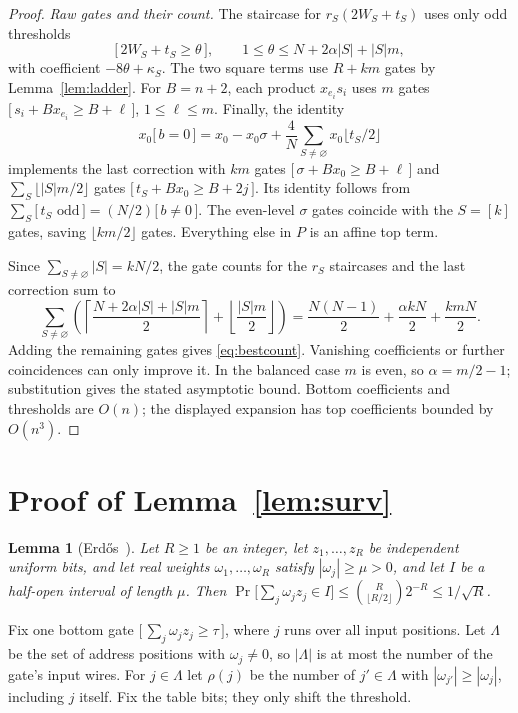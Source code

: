 \documentclass[11pt,letterpaper]{article}
\newtheorem{lemma}[theorem]{Lemma}
\theoremstyle{remark}
\newcommand{\ind}[1]{\bigl[\,#1\,\bigr]}
\newcommand{\sect}[1]{\section{\texorpdfstring{\color{ink}#1}{#1}}}
\begin{document}
\begin{proof}
\emph{Raw gates and their count.}
The staircase for $r_S(2W_S+t_S)$ uses only odd thresholds
\[
\ind{2W_S+t_S\ge\theta},\qquad
1\le\theta\le N+2\alpha|S|+|S|m,
\]
with coefficient $-8\theta+\kappa_S$. The two square terms use $R+km$
gates by Lemma~\ref{lem:ladder}. For $B=n+2$, each product $x_{e_i}s_i$
uses $m$ gates $\ind{s_i+Bx_{e_i}\ge B+\ell}$, $1\le\ell\le m$.
Finally, the identity
\[
x_0\ind{b=0}=x_0-x_0\sigma+
 \frac4N\sum_{S\ne\varnothing}x_0\lfloor t_S/2\rfloor
\]
implements the last correction with $km$ gates
$\ind{\sigma+Bx_0\ge B+\ell}$ and
$\sum_S\lfloor |S|m/2\rfloor$ gates
$\ind{t_S+Bx_0\ge B+2j}$. Its identity follows from
$\sum_S\ind{t_S\text{ odd}}=(N/2)\ind{b\ne0}$.
The even-level $\sigma$ gates coincide with the $S=[k]$ gates, saving
$\lfloor km/2\rfloor$ gates. Everything else in $P$ is an affine top term.

Since $\sum_{S\ne\varnothing}|S|=kN/2$, the gate counts for the $r_S$
staircases and the last correction sum to
\[
\sum_{S\ne\varnothing}\left(
 \left\lceil\frac{N+2\alpha|S|+|S|m}{2}\right\rceil
 +\left\lfloor\frac{|S|m}{2}\right\rfloor\right)
 =\frac{N(N-1)}2+\frac{\alpha kN}2+\frac{kmN}2.
\]
Adding the remaining gates gives \eqref{eq:bestcount}. Vanishing coefficients
or further coincidences can only improve it. In the balanced case $m$ is even,
so $\alpha=m/2-1$; substitution gives the stated asymptotic bound.
Bottom coefficients and thresholds are $O(n)$; the displayed
expansion has top coefficients bounded by $O(n^3)$.
\end{proof}

\renewcommand{\thesection}{\Alph{section}}
\sect{Proof of Lemma~\ref{lem:surv}}\label{app:surv}

\begin{lemma}[Erd\H{o}s~\cite{Erdos}]\label{fact:lo}
Let $R\ge1$ be an integer, let $z_1,\dots,z_R$ be independent uniform
bits, and let real weights $\omega_1,\dots,\omega_R$ satisfy $|\omega_j|\ge\mu>0$, and let $I$ be a half-open interval of length
$\mu$. Then
$\Pr\bigl[\sum_j\omega_jz_j\in I\bigr]\le\binom{R}{\lfloor R/2\rfloor}2^{-R}\le1/\sqrt R$.
\end{lemma}

Fix one bottom gate $\ind{\sum_j\omega_jz_j\ge\tau}$, where $j$ runs over
all input positions. Let $\Lambda$ be the set of address positions with
$\omega_j\ne0$, so $|\Lambda|$ is at most the number of the gate's input wires.
For $j\in \Lambda$ let $\rho(j)$ be the number of $j'\in \Lambda$ with
$|\omega_{j'}|\ge|\omega_j|$, including $j$ itself. Fix the table bits; they
only shift the threshold.
\end{document}
